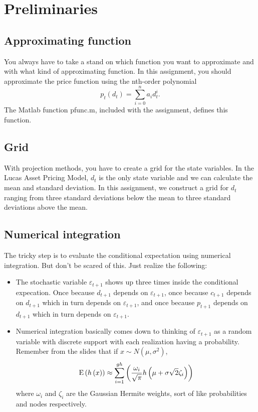 \documentclass{article}
\begin{document}
\section{Preliminaries}

\subsection{Approximating function}

You always have to take a stand on which function you want to approximate
and with what kind of approximating function. In this assignment, you should
approximate the price function using the nth-order polynomial%
\begin{equation*}
p_{t}\left( d_{t}\right) =\sum_{i=0}^{n}a_{i}d_{t}^{i}\text{.}
\end{equation*}%
The Matlab function pfunc.m, included with the assignment, defines this
function.

\subsection{Grid}

With projection methods, you have to create a grid for the state variables.
In the Lucas Asset Pricing Model, $d_{t}$ is the only state variable and we
can calculate the mean and standard deviation. In this assignment, we
construct a grid for $d_{t}$ ranging from three standard deviations below
the mean to three standard deviations above the mean.

\subsection{Numerical integration}

The tricky step is to evaluate the conditional expectation using numerical
integration. But don't be scared of this. Just realize the following:

\begin{itemize}
\item The stochastic variable $\varepsilon _{t+1}$ shows up three times
inside the conditional expecation. Once because $d_{t+1}$ depends on $%
\varepsilon _{t+1}$, once because $c_{t+1}$ depends on $d_{t+1}$ which in
turn depends on $\varepsilon _{t+1}$, and once because $p_{t+1}$ depends on $%
d_{t+1}$ which in turn depends on $\varepsilon _{t+1}$.

\item Numerical integration basically comes down to thinking of $\varepsilon
_{t+1}$ as a random variable with discrete support with each realization
having a probability. Remember from the slides that if $x\sim N\left( \mu
,\sigma ^{2}\right) $,%
\begin{equation*}
\text{E}\left( h\left( x\right) \right) \approx \sum_{i=1}^{gh}\left( \frac{%
\omega _{i}}{\sqrt{\pi }}h\left( \mu +\sigma \sqrt{2}\zeta _{i}\right)
\right)
\end{equation*}%
where $\omega _{i}$ and $\zeta _{i}$ are the Gaussian Hermite weights, sort
of like probabilities and nodes respectively.
\end{itemize}
\end{document}
